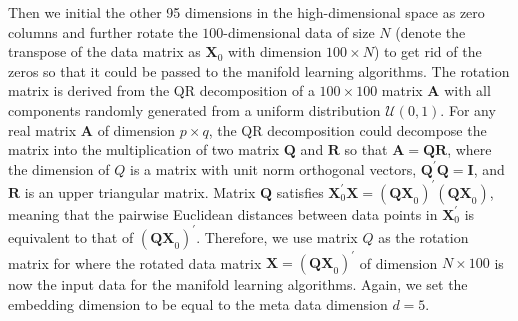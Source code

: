 \documentclass[11pt,a4paper,]{article}
\begin{document}
Then we initial the other 95 dimensions in the high-dimensional space as
zero columns and further rotate the \(100\)-dimensional data of size \(N\)
(denote the transpose of the data matrix as \(\pmb{X}_0\) with dimension
\(100 \times N\)) to get rid of the zeros so that it could be passed to
the manifold learning algorithms. The rotation matrix is derived from
the QR decomposition of a \(100\times 100\) matrix \(\pmb{A}\) with all
components randomly generated from a uniform distribution
\(\mathcal{U}(0,1)\). For any real matrix \(\pmb{A}\) of dimension
\(p\times q\), the QR decomposition could decompose the matrix into the
multiplication of two matrix \(\pmb{Q}\) and \(\pmb{R}\) so that
\(\pmb{A} = \pmb{QR}\), where the dimension of \(Q\) is a matrix with unit
norm orthogonal vectors, \(\pmb{Q}^\prime \pmb{Q} = \pmb{I}\), and
\(\pmb{R}\) is an upper triangular matrix. Matrix \(\pmb{Q}\) satisfies
\(\pmb{X}_0^\prime \pmb{X}=(\pmb{QX}_0)^\prime(\pmb{QX}_0)\), meaning that
the pairwise Euclidean distances between data points in
\(\pmb{X}_0^\prime\) is equivalent to that of \((\pmb{QX}_0)^\prime\).
Therefore, we use matrix \(Q\) as the rotation matrix for where the
rotated data matrix \(\pmb{X} = (\pmb{QX}_0)^\prime\) of dimension
\(N \times 100\) is now the input data for the manifold learning
algorithms. Again, we set the embedding dimension to be equal to the
meta data dimension \(d=5\).
\end{document}
